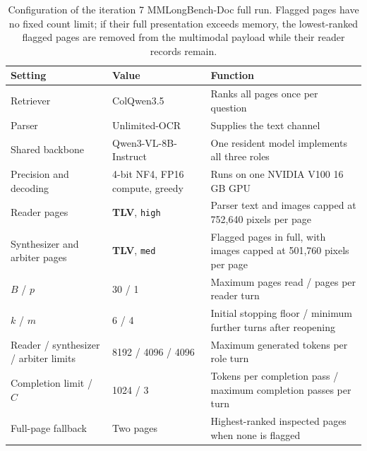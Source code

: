 \label{app:setup_details}

\begin{table}[t]
\centering
\small
\setlength{\tabcolsep}{5pt}
\begin{tabular}{@{}p{}p{}p{}@{}}
\toprule
Setting & Value & Function \\
\midrule
Retriever & ColQwen3.5 & Ranks all pages once per question \\
Parser & Unlimited-OCR & Supplies the text channel \\
Shared backbone & Qwen3-VL-8B-Instruct & One resident model implements all three roles \\
Precision and decoding & 4-bit NF4, FP16 compute, greedy & Runs on one NVIDIA V100 16\,GB GPU \\
Reader pages & \textbf{TLV}, \texttt{high} & Parser text and images capped at 752,640 pixels per page \\
Synthesizer and arbiter pages & \textbf{TLV}, \texttt{med} & Flagged pages in full, with images capped at 501,760 pixels per page \\
$B$ / $p$ & 30 / 1 & Maximum pages read / pages per reader turn \\
$k$ / $m$ & 6 / 4 & Initial stopping floor / minimum further turns after reopening \\
Reader / synthesizer / arbiter limits & 8192 / 4096 / 4096 & Maximum generated tokens per role turn \\
Completion limit / $C$ & 1024 / 3 & Tokens per completion pass / maximum completion passes per turn \\
Full-page fallback & Two pages & Highest-ranked inspected pages when none is flagged \\
\bottomrule
\end{tabular}
\caption{Configuration of the iteration 7 MMLongBench-Doc full run. Flagged pages have no fixed count limit; if their full presentation exceeds memory, the lowest-ranked flagged pages are removed from the multimodal payload while their reader records remain.}
\label{tab:app_validation_config}
\end{table}
